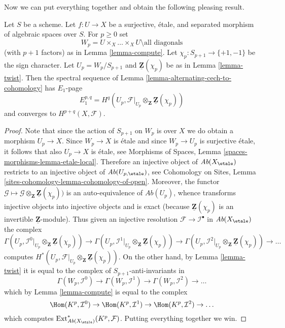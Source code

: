 \noindent
Now we can put everything together and obtain the following
pleasing result.

\begin{lemma}
\label{lemma-alternating-spectral-sequence}
Let $S$ be a scheme. Let $f : U \to X$ be a surjective, \'etale, and
separated morphism of algebraic spaces over $S$. For $p \geq 0$ set
$$
W_p = U \times_X \ldots \times_X U \setminus \text{all diagonals}
$$
(with $p + 1$ factors) as in Lemma \ref{lemma-compute}.
Let $\chi_p : S_{p + 1} \to \{+1, -1\}$ be the sign character.
Let $U_p = W_p/S_{p + 1}$ and $\underline{\mathbf{Z}}(\chi_p)$ be as in
Lemma \ref{lemma-twist}.
Then the spectral sequence of
Lemma \ref{lemma-alternating-cech-to-cohomology}
has $E_1$-page
$$
E_1^{p, q} =
H^q(U_p, \mathcal{F}|_{U_p} \otimes_\mathbf{Z} \underline{\mathbf{Z}}(\chi_p))
$$
and converges to $H^{p + q}(X, \mathcal{F})$.
\end{lemma}

\begin{proof}
Note that since the action of $S_{p + 1}$ on $W_p$ is over $X$ we do
obtain a morphism $U_p \to X$. Since $W_p \to X$ is \'etale and since
$W_p \to U_p$ is surjective \'etale, it follows
that also $U_p \to X$ is \'etale, see
Morphisms of Spaces, Lemma \ref{spaces-morphisms-lemma-etale-local}.
Therefore an injective object of
$\textit{Ab}(X_\etale)$ restricts to an injective object of
$\textit{Ab}(U_{p, \etale})$, see
Cohomology on Sites, Lemma \ref{sites-cohomology-lemma-cohomology-of-open}.
Moreover, the functor
$\mathcal{G} \mapsto
\mathcal{G} \otimes_\mathbf{Z} \underline{\mathbf{Z}}(\chi_p))$
is an auto-equivalence of $\textit{Ab}(U_p)$, whence transforms injective
objects into injective objects and is exact (because
$\underline{\mathbf{Z}}(\chi_p)$ is an invertible
$\underline{\mathbf{Z}}$-module). Thus given an injective resolution
$\mathcal{F} \to \mathcal{I}^\bullet$ in $\textit{Ab}(X_\etale)$
the complex
$$
\Gamma(U_p,
\mathcal{I}^0|_{U_p} \otimes_\mathbf{Z} \underline{\mathbf{Z}}(\chi_p))
\to
\Gamma(U_p,
\mathcal{I}^1|_{U_p} \otimes_\mathbf{Z} \underline{\mathbf{Z}}(\chi_p))
\to
\Gamma(U_p,
\mathcal{I}^2|_{U_p} \otimes_\mathbf{Z} \underline{\mathbf{Z}}(\chi_p))
\to \ldots
$$
computes
$H^*(U_p,
\mathcal{F}|_{U_p} \otimes_\mathbf{Z} \underline{\mathbf{Z}}(\chi_p))$.
On the other hand, by
Lemma \ref{lemma-twist}
it is equal to the complex of $S_{p + 1}$-anti-invariants in
$$
\Gamma(W_p, \mathcal{I}^0) \to
\Gamma(W_p, \mathcal{I}^1) \to
\Gamma(W_p, \mathcal{I}^2) \to \ldots
$$
which by
Lemma \ref{lemma-compute}
is equal to the complex
$$
\Hom(K^p, \mathcal{I}^0) \to
\Hom(K^p, \mathcal{I}^1) \to
\Hom(K^p, \mathcal{I}^2) \to \ldots
$$
which computes
$\text{Ext}^*_{\textit{Ab}(X_\etale)}(K^p, \mathcal{F})$.
Putting everything together we win.
\end{proof}





